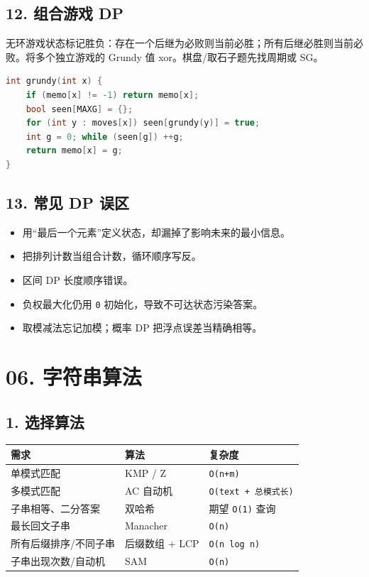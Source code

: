 \section{12. 组合游戏 DP}\label{ux7ec4ux5408ux6e38ux620f-dp}

无环游戏状态标记胜负：存在一个后继为必败则当前必胜；所有后继必胜则当前必败。将多个独立游戏的 Grundy 值 xor。棋盘/取石子题先找周期或 SG。

\begin{lstlisting}[language={C++}]
int grundy(int x) {
    if (memo[x] != -1) return memo[x];
    bool seen[MAXG] = {};
    for (int y : moves[x]) seen[grundy(y)] = true;
    int g = 0; while (seen[g]) ++g;
    return memo[x] = g;
}
\end{lstlisting}

\section{13. 常见 DP 误区}\label{ux5e38ux89c1-dp-ux8befux533a}

\begin{itemize}
\tightlist
\item
  用``最后一个元素''定义状态，却漏掉了影响未来的最小信息。
\item
  把排列计数当组合计数，循环顺序写反。
\item
  区间 DP 长度顺序错误。
\item
  负权最大化仍用 \passthrough{\lstinline!0!} 初始化，导致不可达状态污染答案。
\item
  取模减法忘记加模；概率 DP 把浮点误差当精确相等。
\end{itemize}

\chapter{06. 字符串算法}\label{ux5b57ux7b26ux4e32ux7b97ux6cd5}

\section{1. 选择算法}\label{ux9009ux62e9ux7b97ux6cd5}

\begin{longtable}[]{@{}lll@{}}
\toprule\noalign{}
需求 & 算法 & 复杂度 \\
\midrule\noalign{}
\endhead
\bottomrule\noalign{}
\endlastfoot
单模式匹配 & KMP / Z & \passthrough{\lstinline!O(n+m)!} \\
多模式匹配 & AC 自动机 & \passthrough{\lstinline!O(text + 总模式长)!} \\
子串相等、二分答案 & 双哈希 & 期望 \passthrough{\lstinline!O(1)!} 查询 \\
最长回文子串 & Manacher & \passthrough{\lstinline!O(n)!} \\
所有后缀排序/不同子串 & 后缀数组 + LCP & \passthrough{\lstinline!O(n log n)!} \\
子串出现次数/自动机 & SAM & \passthrough{\lstinline!O(n)!} \\
\end{longtable}

